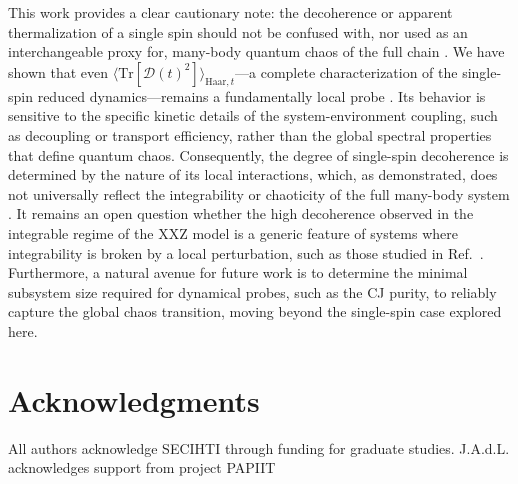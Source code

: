 \documentclass[letterpaper,superscriptaddress,aps,pra,nolongbibliography,showpacs,floatfix,dvipsnames,10pt,twocolumn]{revtex4-2}
\newcommand{\choip}{\langle \text{Tr}[\mathcal{D}(t)^2] \rangle_{\mathrm{Haar}, t}}
\begin{document}
This work provides a clear cautionary note: the decoherence or apparent
thermalization of a single spin should not be confused with, nor
used as an interchangeable proxy for, many-body quantum chaos of the
full chain . 
We have shown that even $\choip$—a complete characterization of the
single-spin reduced dynamics—remains a fundamentally local probe . Its
behavior is sensitive to the specific kinetic details of the
system-environment coupling, such as decoupling or transport
efficiency, rather than the global spectral properties that define
quantum chaos. Consequently, the degree of single-spin decoherence is
determined by the nature of its local interactions, which, as
demonstrated, does not universally reflect the integrability or
chaoticity of the full many-body system . It remains an open question
whether the high decoherence observed in the integrable regime of the
XXZ model is a generic feature of systems where integrability is
broken by a local perturbation, such as those studied in
Ref.~\cite{santos_2020_speck}. Furthermore, a natural avenue for
future work is to determine the minimal subsystem size required for
dynamical probes, such as the CJ purity, to reliably capture
the global chaos transition, moving beyond the single-spin case
explored here.


\section*{Acknowledgments}
All authors acknowledge SECIHTI through funding for graduate studies.
J.A.d.L. acknowledges support from project PAPIIT  

%

\appendix
%




\end{document}
